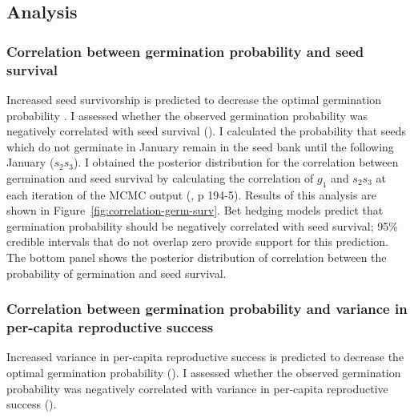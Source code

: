 \documentclass[12pt, oneside, titlepage]{article}   	%
\begin{document}
{\subsection*{Analysis}

\subsubsection*{Correlation between germination probability and seed survival}

Increased seed survivorship is predicted to decrease the optimal germination probability \cite{cohen1966,ellner1985a}. I assessed whether the observed germination probability was negatively correlated with seed survival (\cite{gremer2014}). I calculated the probability that seeds which do not germinate in January remain in the seed bank until the following January ($s_2 s_3$). I obtained the posterior distribution for the correlation between germination and seed survival by calculating the correlation of $g_1$ and $s_2 s_3$ at each iteration of the MCMC output (\cite{hobbs2015b}, p 194-5). Results of this analysis are shown in Figure~\ref{fig:correlation-germ-surv}. Bet hedging models predict that germination probability should be negatively correlated with seed survival; 95\% credible intervals that do not overlap zero provide support for this prediction. The bottom panel shows the posterior distribution of correlation between the probability of germination and seed survival. %


\subsubsection*{Correlation between germination probability and variance in per-capita reproductive success}

Increased variance in per-capita reproductive success is predicted to decrease the optimal germination probability (\cite{cohen1966,ellner1985a}). I assessed whether the observed germination probability was negatively correlated with variance in per-capita reproductive success (\cite{venable2007}).

}
\end{document}
